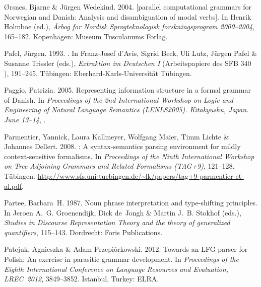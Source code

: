 \begin{thebibliography}{1420}
{}{\O}rsnes, Bjarne \& J{\"u}rgen Wedekind. 2004.
 [parallel computational grammars for
  {Norwegian} and {Danish}: {Analysis} and disambiguation of modal verbs].
\newblock In Henrik Holmboe (ed.), \emph{{{\AA}rbog for Nordisk
  Sprogteknologisk forskningsprogram 2000--2004}}, 165--182. Kopenhagen: Museum
  Tusculanums Forlag.

Pafel, J{\"u}rgen. 1993.
.
\newblock In Franz-Josef d'Avis, Sigrid Beck, Uli Lutz, J{\"u}rgen Pafel \&
  Susanne Trissler (eds.), \emph{{Extraktion im Deutschen I}} (Arbeitspapiere
  des SFB 340 ), 191--245. T{\"u}bingen:
  Eberhard-Karls-Uni\-ver\-si\-t{\"a}t T{\"u}bingen.

Paggio, Patrizia. 2005.
\newblock Representing information structure in a formal grammar of {Danish}.
\newblock In \emph{Proceedings of the {2nd International Workshop on Logic and
  Engineering of Natural Language Semantics (LENLS2005). Kitakyushu, Japan.
  June 13--14}}, .

Parmentier, Yannick, Laura Kallmeyer, Wolfgang Maier, Timm Lichte \& Johannes
  Dellert. 2008.
: {A} syntax-semantics parsing environment for mildly
  context-sensitive formalisms.
\newblock In \emph{Proceedings of the {Ninth International Workshop on Tree
  Adjoining Grammars and Related Formalisms (TAG+9)}}, 121--128. T{\"u}bingen.
\newblock
  \urlprefix\url{http://www.sfs.uni-tuebingen.de/~lk/papers/tag+9-parmentier-et-al.pdf}.

Partee, Barbara~H. 1987.
\newblock Noun phrase interpretation and type-shifting principles.
\newblock In Jeroen A.~G. Groenendijk, Dick de~Jongh \& Martin J.~B. Stokhof
  (eds.), \emph{Studies in {Discourse Representation Theory} and the theory of
  generalized quantifiers}, 115--143. Dordrecht: Foris Publications.

Patejuk, Agnieszka \& Adam Przepi{\'o}rkowski. 2012.
\newblock Towards an {LFG} parser for {Polish}: {An} exercise in parasitic
  grammar development.
\newblock In \emph{Proceedings of the {Eighth International Conference on
  Language Resources and Evaluation, LREC}~2012}, 3849--3852. Istanbul, Turkey:
  ELRA.


\end{thebibliography}
